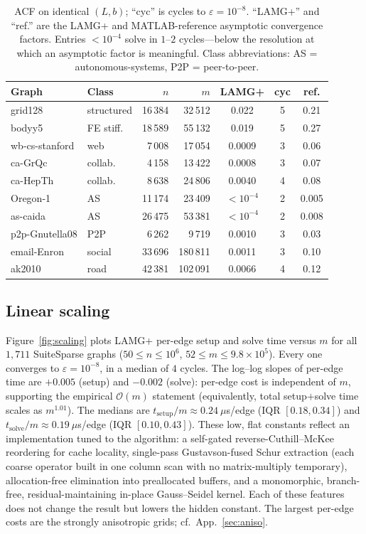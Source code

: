 \documentclass[review]{siamart220329}
\newcommand{\Om}{\mathcal{O}(m)}
\begin{document}
\begin{table}[t]\centering\small
\caption{ACF on identical $(L,b)$; ``cyc'' is cycles to $\varepsilon=10^{-8}$.
``LAMG+'' and ``ref.'' are the LAMG+ and MATLAB-reference asymptotic convergence factors.
Entries $<10^{-4}$ solve in $1$--$2$ cycles---below the resolution at which an asymptotic
factor is meaningful. Class abbreviations: AS = autonomous-systems, P2P = peer-to-peer.}\label{tab:acf}
\begin{tabular}{llrrccc}
\toprule
Graph & Class & $n$ & $m$ & LAMG+ & cyc & ref.\\
\midrule
grid128        & structured  & 16\,384 & 32\,512  & 0.022      & 5 & 0.21\\
bodyy5         & FE stiff.   & 18\,589 & 55\,132  & 0.019      & 5 & 0.27\\
wb-cs-stanford & web         & 7\,008  & 17\,054  & 0.0009     & 3 & 0.06\\
ca-GrQc        & collab.     & 4\,158  & 13\,422  & 0.0008     & 3 & 0.07\\
ca-HepTh       & collab.     & 8\,638  & 24\,806  & 0.0040     & 4 & 0.08\\
Oregon-1       & AS          & 11\,174 & 23\,409  & $<10^{-4}$ & 2 & 0.005\\
as-caida       & AS          & 26\,475 & 53\,381  & $<10^{-4}$ & 2 & 0.008\\
p2p-Gnutella08 & P2P         & 6\,262  & 9\,719   & 0.0010     & 3 & 0.03\\
email-Enron    & social      & 33\,696 & 180\,811 & 0.0011     & 3 & 0.10\\
ak2010         & road        & 42\,381 & 102\,091 & 0.0066     & 4 & 0.12\\
\bottomrule
\end{tabular}
\end{table}

\subsection{Linear scaling}\label{sec:scaling}
Figure~\ref{fig:scaling} plots LAMG+ per-edge setup and solve time versus $m$ for all $1{,}711$
SuiteSparse graphs ($50\le n\le10^6$, $52 \le m \le 9.8\!\times\!10^5$). Every one converges to $\varepsilon=10^{-8}$, in a median of $4$ cycles. The log--log slopes of per-edge time are $+0.005$ (setup)
and $-0.002$ (solve): per-edge cost is independent of $m$, supporting the empirical $\Om$ statement
(equivalently, total setup$+$solve time scales as $m^{1.01}$). The medians are
$t_{\text{setup}}/m\approx0.24~\mu$s/edge (IQR $[0.18,0.34]$) and
$t_{\text{solve}}/m\approx0.19~\mu$s/edge (IQR $[0.10,0.43]$). These low, flat constants reflect an
implementation tuned to the algorithm: a self-gated reverse-Cuthill--McKee reordering for cache
locality, single-pass Gustavson-fused Schur extraction (each coarse operator built in one column scan
with no matrix-multiply temporary), allocation-free elimination into preallocated buffers, and a
monomorphic, branch-free, residual-maintaining in-place Gauss--Seidel kernel. Each of these features does not change the result but lowers the hidden constant.
The largest per-edge costs are the strongly anisotropic grids; cf.~App.~\ref{sec:aniso}.
\end{document}
